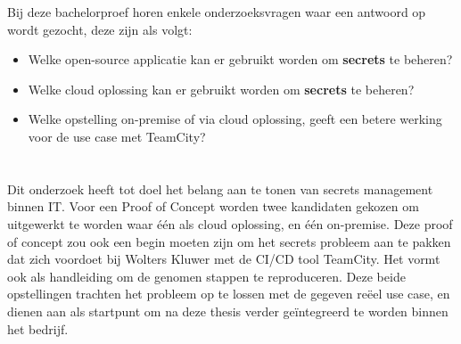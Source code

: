 Bij deze bachelorproef horen enkele onderzoeksvragen waar een antwoord op wordt gezocht, deze zijn als volgt:

\begin{itemize}
    \item Welke open-source applicatie kan er gebruikt worden om \textbf{secrets} te beheren?
    \item Welke cloud oplossing kan er gebruikt worden om \textbf{secrets} te beheren?
    \item Welke opstelling on-premise of via cloud oplossing, geeft een betere werking voor de use case met TeamCity?
\end{itemize}


\section{}
\label{sec:onderzoeksdoelstelling}


Dit onderzoek heeft tot doel het belang aan te tonen van secrets management binnen IT. Voor een Proof of Concept worden twee kandidaten gekozen om uitgewerkt te worden waar één als cloud oplossing, en één on-premise. Deze proof of concept zou ook een begin moeten zijn om het secrets probleem aan te pakken dat zich voordoet bij Wolters Kluwer met de CI/CD tool TeamCity. Het vormt ook als handleiding om de genomen stappen te reproduceren. Deze beide opstellingen trachten het probleem op te lossen met de gegeven reëel use case, en dienen aan als startpunt om na deze thesis verder geïntegreerd te worden binnen het bedrijf.


\section{}
\label{sec:opzet-bachelorproef}

